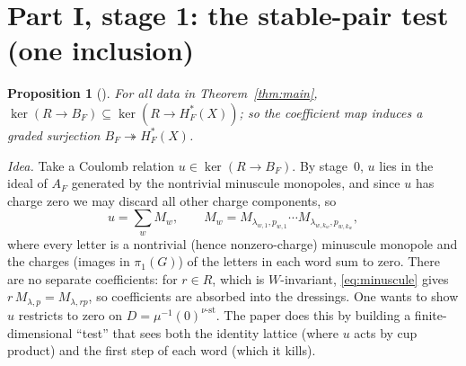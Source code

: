 \documentclass[11pt]{amsart}
\newtheorem{proposition}[theorem]{Proposition}
\theoremstyle{remark}
\newcommand{\Hc}{H^*_F(X)}
\begin{document}
\section{Part I, stage 1: the stable-pair test (one inclusion)}

\begin{proposition}[{\cite[Prop.~4.1]{OAI-Hikita}}]
For all data in Theorem~\ref{thm:main}, $\ker(R\to B_F)\subseteq\ker(R\to\Hc)$;
so the coefficient map induces a graded surjection $B_F\twoheadrightarrow\Hc$.
\end{proposition}

\noindent\emph{Idea.}  Take a Coulomb relation $u\in\ker(R\to B_F)$.  By
stage~0, $u$ lies in the ideal of $A_F$ generated by the nontrivial minuscule
monopoles, and since $u$ has charge zero we may discard all other charge
components, so
\[
 u=\sum_w M_w,\qquad
 M_w=M_{\lambda_{w,1},p_{w,1}}\cdots M_{\lambda_{w,k_w},p_{w,k_w}},
\]
where every letter is a nontrivial (hence nonzero-charge) minuscule
monopole and the charges (images in $\pi_1(G)$) of the letters in each word
sum to zero.  There are no separate coefficients: for $r\in R$, which is
$W$-invariant, \eqref{eq:minuscule} gives $r\,M_{\lambda,p}=M_{\lambda,rp}$,
so coefficients are absorbed into the dressings.
One wants to show $u$ restricts to zero on $D=\mu^{-1}(0)^{\nu\text{-st}}$.
The paper does this by building a finite-dimensional ``test'' that sees both
the identity lattice (where $u$ acts by cup product) and the first step of
each word (which it kills).
\end{document}
